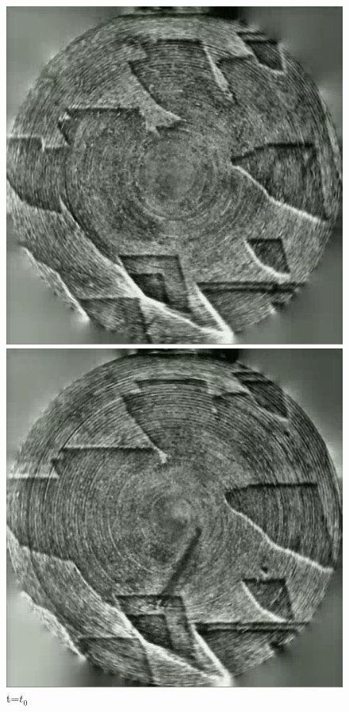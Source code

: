 \begin{figure}[!ht]
\centering
{}
    \includegraphics[width=\linewidth]{images/calcite1.png}
    \caption*{t=$t_0$} 
\endminipage\hfill
{}
    \includegraphics[width=\linewidth]{images/calcite2.png}

\end{figure}
